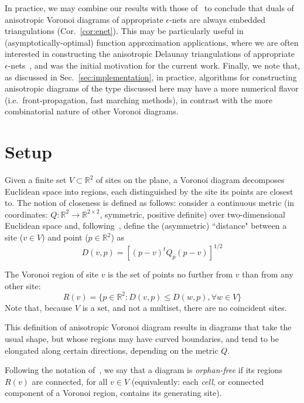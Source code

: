 \documentclass[11pt]{article}
\begin{document}
In practice, we may combine our results with those of~\cite{avd}  
to conclude that duals of anisotropic Voronoi diagrams of appropriate $\epsilon$-nets 
are always embedded triangulations (Cor.~\ref{cor:enet}). 
This may be particularly useful in (asymptotically-optimal) function approximation applications, 
where we are often interested in 
constructing the anisotropic Delaunay triangulations of appropriate $\epsilon$-nets~\cite{enets,GruberOQ}, and was the initial motivation for the current work. 
Finally, we note that, as discussed in Sec.~\ref{sec:implementation}, in practice, 
algorithms for constructing anisotropic diagrams of the type discussed here may have a more numerical flavor  
(i.e.\  front-propagation, fast marching methods), in contrast with the more combinatorial nature of other Voronoi diagrams. 




\section{Setup}\label{sec:setup}


Given a finite set $V\subset\mathbb{R}^2$ of sites on the plane, 
a Voronoi diagram decomposes Euclidean space into regions, each distinguished by the site
its points are closest to. 
The notion of closeness is defined as follows:
consider a continuous metric (in coordinates: $Q:\mathbb{R}^2\rightarrow\mathbb{R}^{2\times 2}$, 
symmetric, positive definite) 
over two-dimensional Euclidean space and,
following~\cite{DW}, define the (asymmetric) ``distance" between a site
($v\in V$) and point ($p\in\mathbb{R}^2$) as
\[ D(v,p) = \left[(p-v)^t Q_p (p-v)\right]^{1/2} \]


The Voronoi region of site $v$ is the set of points no further from $v$ than
from any other site:
\[ R(v) = \{p\in\mathbb{R}^2 : D(v,p) \le D(w,p), \forall w\in V\} \]
Note that, because $V$ is a set, and not a multiset, there are no coincident sites. 


This definition of anisotropic Voronoi diagram results in diagrams that take the usual shape, but
whose regions may have curved boundaries, and tend to be elongated along
certain directions, depending on the metric $Q$. 



Following the notation of~\cite{LS}, we say that a diagram is
\emph{orphan-free} if its regions $R(v)$ are connected, for all $v\in V$
(equivalently: each \emph{cell}, or connected component of a Voronoi region, 
{contains} its generating site).
\end{document}
